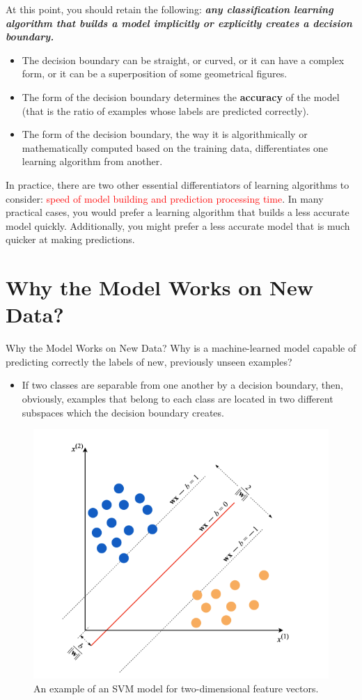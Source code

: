 \documentclass[10pt,dvipsnames]{beamer}
\begin{document}
\begin{frame}
    At this point, you should retain the following: \textbf{\textit{any classification learning algorithm that builds a model implicitly or explicitly creates a decision boundary.}}
    \begin{itemize}
        \item  The decision boundary can be straight, or curved, or it can have a complex form, or it can be a superposition of some geometrical figures.
        \item The form of the decision boundary determines the \textbf{accuracy} of the model (that is the ratio of examples whose labels are predicted correctly).
        \item The form of the decision boundary, the way it is algorithmically or mathematically computed based on the training data, differentiates one learning algorithm from another.
    \end{itemize}
    In practice, there are two other essential differentiators of learning algorithms to consider: \textcolor{red}{speed of model building and prediction processing time}. In many practical cases, you would prefer a learning algorithm that builds a less accurate model quickly. Additionally, you might prefer a less accurate model that is much quicker at making predictions.
\end{frame}

\section{Why the Model Works on New Data?}
\begin{frame}{Why the Model Works on New Data?}
    Why is a machine-learned model capable of predicting correctly the labels of new, previously unseen examples?
    \begin{itemize}
        \item If two classes are separable from one another by a decision boundary, then, obviously, examples that belong to each class are located in two different subspaces which the decision boundary creates.
    \end{itemize}
    \begin{figure}[ht]
        \centering
        \includegraphics[width=0.5\linewidth]{imgs/intro_1.png}
        \caption{An example of an SVM model for two-dimensional feature vectors.}
    \end{figure}
\end{frame}
\end{document}
